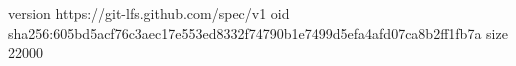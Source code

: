 version https://git-lfs.github.com/spec/v1
oid sha256:605bd5acf76c3aec17e553ed8332f74790b1e7499d5efa4afd07ca8b2ff1fb7a
size 22000
